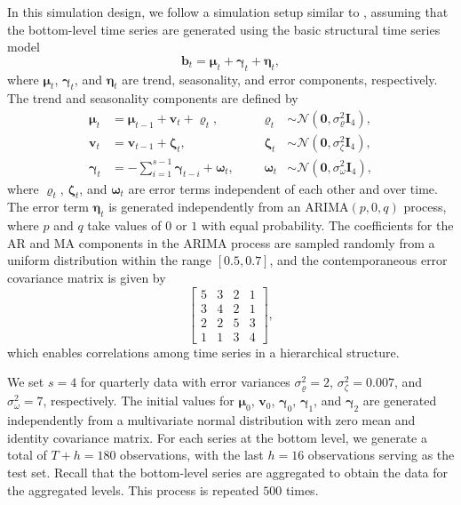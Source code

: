 \documentclass[
  12pt,
  11pt]{article}
\begin{document}
In this simulation design, we follow a simulation setup similar to
\citet{Wickramasuriya2019-fc}, assuming that the bottom-level time
series are generated using the basic structural time series model \[
\bm{b}_t=\bm{\mu}_t+\bm{\gamma}_t+\bm{\eta}_t,
\] where \(\bm{\mu}_t\), \(\bm{\gamma}_t\), and \(\bm{\eta}_t\) are
trend, seasonality, and error components, respectively. The trend and
seasonality components are defined by \begin{align*}
\bm{\mu}_t & =\bm{\mu}_{t-1}+\bm{v}_t+\bm{\varrho}_t, &&& \bm{\varrho}_t & \sim \mathcal{N}\left(\bm{0}, \sigma_{\varrho}^2 \bm{I}_4\right), \\
\bm{v}_t & =\bm{v}_{t-1}+\bm{\zeta}_t, &&& \bm{\zeta}_t & \sim \mathcal{N}\left(\bm{0}, \sigma_\zeta^2 \bm{I}_4\right), \\
\bm{\gamma}_t & =-\sum_{i=1}^{s-1} \bm{\gamma}_{t-i}+\bm{\omega}_t, &&& \bm{\omega}_t & \sim \mathcal{N}\left(\bm{0}, \sigma_\omega^2 \bm{I}_4\right),
\end{align*} where \(\bm{\varrho}_t\), \(\bm{\zeta}_t\), and
\(\bm{\omega}_t\) are error terms independent of each other and over
time. The error term \(\bm{\eta}_t\) is generated independently from an
\(\text{ARIMA}(p,0,q)\) process, where \(p\) and \(q\) take values of
\(0\) or \(1\) with equal probability. The coefficients for the AR and
MA components in the ARIMA process are sampled randomly from a uniform
distribution within the range \([0.5, 0.7]\), and the contemporaneous
error covariance matrix is given by \[
\left[\begin{array}{llll}
5 & 3 & 2 & 1 \\
3 & 4 & 2 & 1 \\
2 & 2 & 5 & 3 \\
1 & 1 & 3 & 4
\end{array}\right],
\] which enables correlations among time series in a hierarchical
structure.

We set \(s = 4\) for quarterly data with error variances
\(\sigma_{\varrho}^2=2\), \(\sigma_\zeta^2=0.007\), and
\(\sigma_\omega^2=7\), respectively. The initial values for
\(\bm{\mu}_0\), \(\bm{v}_0\), \(\bm{\gamma}_0\), \(\bm{\gamma}_1\), and
\(\bm{\gamma}_2\) are generated independently from a multivariate normal
distribution with zero mean and identity covariance matrix. For each
series at the bottom level, we generate a total of \(T+h = 180\)
observations, with the last \(h = 16\) observations serving as the test
set. Recall that the bottom-level series are aggregated to obtain the
data for the aggregated levels. This process is repeated \(500\) times.
\end{document}
